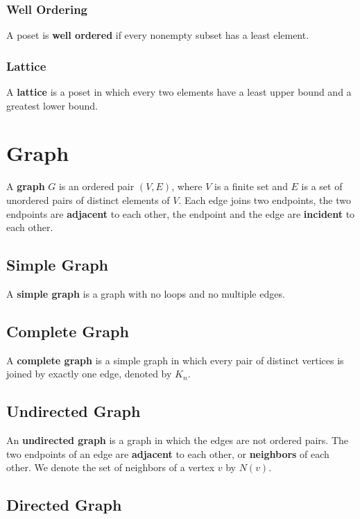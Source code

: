 \documentclass[a4paper,12pt]{article}
\begin{document}
\subsubsection{Well Ordering}

A poset is \textbf{well ordered} if every nonempty subset has a least element.

\subsubsection{Lattice}

A \textbf{lattice} is a poset in which every two elements have a least upper bound and a greatest lower bound.

\section{Graph}

A \textbf{graph} $G$ is an ordered pair $(V,E)$, where $V$ is a finite set and $E$ is a set of unordered pairs of distinct elements of $V$.
Each edge joins two endpoints, the two endpoints are \textbf{adjacent} to each other, the endpoint and the edge are \textbf{incident} to each other.

\subsection{Simple Graph}

A \textbf{simple graph} is a graph with no loops and no multiple edges.

\subsection{Complete Graph}

A \textbf{complete graph} is a simple graph in which every pair of distinct vertices is joined by exactly one edge, denoted by $K_n$.

\subsection{Undirected Graph}

An \textbf{undirected graph} is a graph in which the edges are not ordered pairs.
The two endpoints of an edge are \textbf{adjacent} to each other, or \textbf{neighbors} of each other.
We denote the set of neighbors of a vertex $v$ by $N(v)$.

\subsection{Directed Graph}
\end{document}
